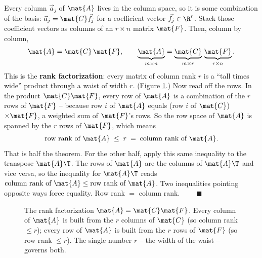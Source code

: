 Every column $\vec{a}_j$ of $\mat{A}$ lives in the column space, so it is some
combination of the basis: $\vec{a}_j = \mat{C}\vec{f}_j$ for a coefficient vector
$\vec{f}_j \in \R^r$. Stack those coefficient vectors as columns of an $r\times n$
matrix $\mat{F}$. Then, column by column,
\[
  \mat{A} = \mat{C}\,\mat{F}, \qquad
  \underbrace{\mat{A}}_{m\times n} =
  \underbrace{\mat{C}}_{m\times r}\,
  \underbrace{\mat{F}}_{r\times n}.
\]
This is the \textbf{rank factorization}: every matrix of column rank $r$ is a
``tall times wide'' product through a waist of width $r$. (Figure
\ref{ch16:rankfac}.) Now read off the rows. In the product $\mat{C}\mat{F}$, every
row of $\mat{A}$ is a combination of the $r$ rows of $\mat{F}$ -- because row $i$
of $\mat{A}$ equals (row $i$ of $\mat{C}$) $\times \mat{F}$, a weighted sum of
$\mat{F}$'s rows. So the row space of $\mat{A}$ is spanned by the $r$ rows of
$\mat{F}$, which means
\[
  \text{row rank of } \mat{A} \;\le\; r \;=\; \text{column rank of } \mat{A}.
\]
That is half the theorem. For the other half, apply this same inequality to the
transpose $\mat{A}\T$. The rows of $\mat{A}$ are the columns of $\mat{A}\T$ and
vice versa, so the inequality for $\mat{A}\T$ reads
$\text{column rank of }\mat{A} \le \text{row rank of }\mat{A}$. Two inequalities
pointing opposite ways force equality. Row rank $=$ column rank. $\qquad\blacksquare$

\begin{figure}[H]
\centering
{}
\caption{The rank factorization $\protect\mat{A}=\protect\mat{C}\protect\mat{F}$.
Every column of $\protect\mat{A}$ is built from the $r$ columns of $\protect\mat{C}$
(so column rank $\le r$); every row of $\protect\mat{A}$ is built from the $r$ rows
of $\protect\mat{F}$ (so row rank $\le r$). The single number $r$ -- the width of
the waist -- governs both.}
\label{ch16:rankfac}
\end{figure}

